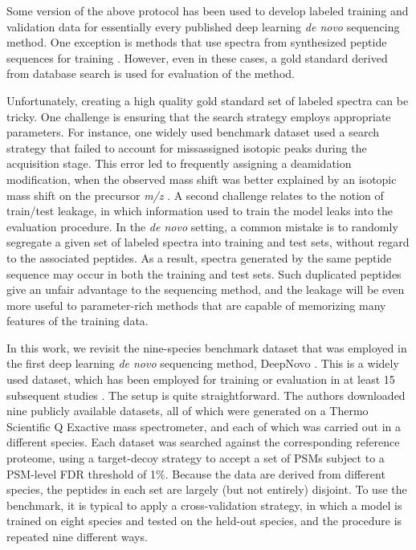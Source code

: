 \documentclass{article}
\begin{document}
Some version of the above protocol has been used to develop labeled training and validation data for essentially every published deep learning \textit{de novo} sequencing method.
One exception is methods that use spectra from synthesized peptide sequences for training \cite{karunratanakul2019uncovering, eloff2023denovo, liu2023accurate}.
However, even in these cases, a gold standard derived from database search is used for evaluation of the method.

Unfortunately, creating a high quality gold standard set of labeled spectra can be tricky.
One challenge is ensuring that the search strategy employs appropriate parameters.
For instance, one widely used benchmark dataset \cite{tran2017denovo} used a search strategy that failed to account for missassigned isotopic peaks during the acquisition stage.
This error led to frequently assigning a deamidation modification, when the observed mass shift was better explained by an isotopic mass shift on the precursor \textit{m/z} \cite{bittremieux2024deep}.
A second challenge relates to the notion of train/test leakage, in which information used to train the model leaks into the evaluation procedure.
In the \textit{de novo} setting, a common mistake is to randomly segregate a given set of labeled spectra into training and test sets, without regard to the associated peptides.
As a result, spectra generated by the same peptide sequence may occur in both the training and test sets.
Such duplicated peptides give an unfair advantage to the sequencing method, and the leakage will be even more useful to parameter-rich methods that are capable of memorizing many features of the training data.

In this work, we revisit the nine-species benchmark dataset that was employed in the first deep learning \textit{de novo} sequencing method, DeepNovo \cite{tran2017denovo}.
This is a widely used dataset, which has been employed for training or evaluation in at least 15 subsequent studies \cite{yang2024introducing, yang2022dpst, yang2019pnovo, xia2024adanovo, wu2023biatnovo, qiao2021computationally, liu2020residual, lee2024bidirectional, klaproth2024deep, jin2023contranovo, ge2022deps, eloff2023denovo, ebrahimi2024transformer, yilmaz2022denovo, yilmaz2024sequence}.
The setup is quite straightforward.
The authors downloaded nine publicly available datasets, all of which were generated on a Thermo Scientific Q Exactive mass spectrometer, and each of which was carried out in a different species.
Each dataset was searched against the corresponding reference proteome, using a target-decoy strategy to accept a set of PSMs subject to a PSM-level FDR threshold of 1\%.
Because the data are derived from different species, the peptides in each set are largely (but not entirely) disjoint.
To use the benchmark, it is typical to apply a cross-validation strategy, in which a model is trained on eight species and tested on the held-out species, and the procedure is repeated nine different ways.
\end{document}
